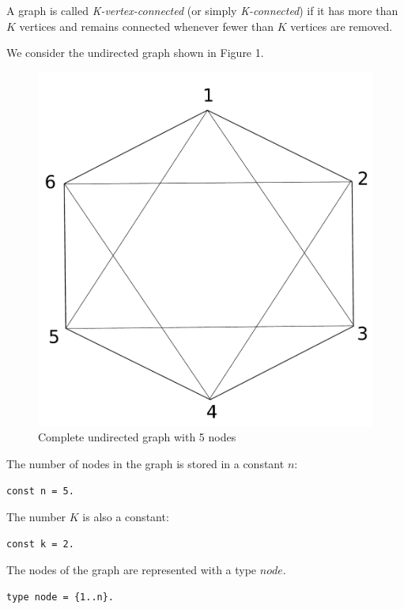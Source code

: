 \documentclass[a4paper,10pt]{article}
\begin{document}
A graph is called \textit{K-vertex-connected} (or simply \textit{K-connected})  if it has more than $K$ vertices and remains connected whenever fewer than $K$ vertices are removed.

\medskip\noindent
We consider the undirected graph shown in Figure 1.


\begin{figure}[h!]
\centering
\includegraphics[scale=0.3]{drawing}
\caption{Complete undirected graph with 5 nodes}
\end{figure}\label{fig1}


\noindent


\medskip\noindent
The number of nodes in the graph is stored in a constant $n$:
\begin{verbatim}
const n = 5.
\end{verbatim}

\medskip\noindent
The number $K$ is also a constant:
\begin{verbatim}
const k = 2.
\end{verbatim} 

\medskip\noindent
The nodes of the graph are represented with a type $node$.

\begin{verbatim}
type node = {1..n}.
\end{verbatim}
\end{document}
